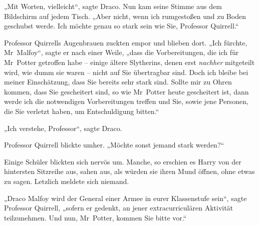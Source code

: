 „Mit Worten, vielleicht“, sagte Draco. Nun kam seine Stimme aus dem Bildschirm auf jedem Tisch. „Aber nicht, wenn ich rumgestoßen und zu Boden geschubst werde. Ich möchte genau so stark sein wie Sie, Professor Quirrell.“

Professor Quirrells Augenbrauen zuckten empor und blieben dort. „Ich fürchte, Mr~Malfoy“, sagte er nach einer Weile, „dass die Vorbereitungen, die ich für Mr~Potter getroffen habe – einige ältere Slytherins, denen erst \emph{nachher} mitgeteilt wird, wie dumm sie waren – nicht auf Sie übertragbar sind. Doch ich bleibe bei meiner Einschätzung, dass Sie bereits sehr stark sind. Sollte mir zu Ohren kommen, dass Sie gescheitert sind, so wie Mr~Potter heute gescheitert ist, dann werde ich die notwendigen Vorbereitungen treffen und Sie, sowie jene Personen, die Sie verletzt haben, um Entschuldigung bitten.“

„Ich verstehe, Professor“, sagte Draco.

Professor Quirrell blickte umher. „Möchte sonst jemand stark werden?“

Einige Schüler blickten sich nervös um. Manche, so erschien es Harry von der hintersten Sitzreihe aus, sahen aus, als würden sie ihren Mund öffnen, ohne etwas zu sagen. Letzlich meldete sich niemand.

„Draco Malfoy wird der General einer Armee in eurer Klassenstufe sein“, sagte Professor Quirrell, „sofern er gedenkt, an jener extracurriculären Aktivität teilzunehmen. Und nun, Mr~Potter, kommen Sie bitte vor.“

